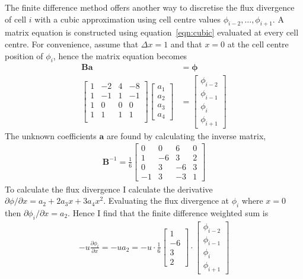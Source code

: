 \documentclass{article}
\begin{document}
The finite difference method offers another way to discretise the flux divergence of cell $i$ with a cubic approximation using cell centre values $\phi_{i-2}, \ldots, \phi_{i+1}$.  A matrix equation is constructed using equation~\eqref{eqn:cubic} evaluated at every cell centre.  For convenience, assume that $\Delta x = 1$ and that $x=0$ at the cell centre position of $\phi_i$, hence the matrix equation becomes
\begin{align}
	\mathbf{B} \mathbf{a} &= \bm{\phi} \\
	\begin{bmatrix}
		1 & -2 & 4 & -8 \\
		1 & -1 & 1 & -1 \\
		1 &  0 & 0 &  0\\
		1 &  1 & 1 &  1\\
	\end{bmatrix}
	\begin{bmatrix}
		a_1 \\
		a_2 \\
		a_3 \\
		a_4
	\end{bmatrix}
	&=
	\begin{bmatrix}
		\phi_{i-2} \\
		\phi_{i-1} \\
		\phi_i \\
		\phi_{i+1}
	\end{bmatrix}
\end{align}
The unknown coefficients $\mathbf{a}$ are found by calculating the inverse matrix,
\begin{align}
	\mathbf{B}^{-1} = 
	\frac{1}{6}
	\begin{bmatrix}
		0 & 0 & 6 & 0 \\
		1 & -6 & 3 & 2 \\
		0 & 3 & -6 & 3 \\
		-1 & 3 & -3 & 1
	\end{bmatrix}
\end{align}
To calculate the flux divergence I calculate the derivative $\partial \phi / \partial x = a_2 + 2 a_3 x + 3 a_4 x^2$.  Evaluating the flux divergence at $\phi_i$ where $x=0$ then $\partial \phi_i / \partial x = a_2$.  Hence I find that the finite difference weighted sum is
\begin{align}
	-u \frac{\partial \phi_i}{\partial x} = -u a_2 =
	-u \cdot \frac{1}{6}
	\begin{bmatrix}
		1 \\ -6 \\ 3 \\ 2
	\end{bmatrix}
	\cdot
	\begin{bmatrix}
		\phi_{i-2} \\
		\phi_{i-1} \\
		\phi_i \\
		\phi_{i+1}
	\end{bmatrix} \label{eqn:fd-fluxdiv}
\end{align}
\end{document}
